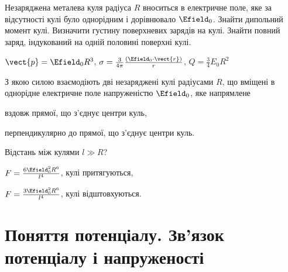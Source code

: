 \begin{problem}%
Незаряджена металева куля радіуса $R$ вноситься в електричне поле, яке за відсутності кулі було однорідним і дорівнювало $\Efield_0$. Знайти дипольний момент кулі. Визначити густину поверхневих зарядів на кулі. Знайти повний заряд, індукований на одній половині поверхні кулі.
\begin{solution}
	$\vect{p} = \Efield_0 R^3$,
	$\sigma = \frac{3}{4\pi} \frac{\left( \Efield_0\cdot\vect{r}\right) }{r}$,
	$Q = \frac34 E_0 R^2$
\end{solution}
\end{problem}

\begin{problem}
З якою силою взаємодіють дві незаряджені кулі радіусами $R$, що вміщені в однорідне електричне поле напруженістю $\Efield_0$, яке напрямлене
\begin{enumerate*}[label=\alph*)]
	\item вздовж прямої, що з'єднує центри куль,
	\item перпендикулярно до прямої, що з'єднує центри куль.
\end{enumerate*}
Відстань між кулями $l \gg R$?
\begin{solution}
	\begin{enumerate*}[label=\alph*)]
		\item $F = \frac{6\Efield_0^2R^6}{l^4}$, кулі притягуються,
		\item $F = \frac{3\Efield_0^2R^6}{l^4}$, кулі відштовхуються.
	\end{enumerate*}
\end{solution}
\end{problem}

\section{Поняття потенціалу. Зв'язок потенціалу і напруженості}

